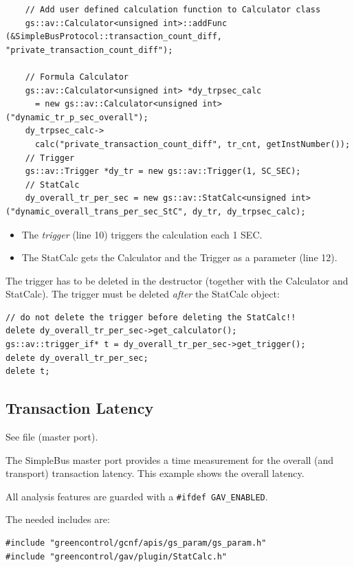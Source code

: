 \begin{lstlisting}
    // Add user defined calculation function to Calculator class
    gs::av::Calculator<unsigned int>::addFunc        (&SimpleBusProtocol::transaction_count_diff, "private_transaction_count_diff"); 

    // Formula Calculator
    gs::av::Calculator<unsigned int> *dy_trpsec_calc
      = new gs::av::Calculator<unsigned int> ("dynamic_tr_p_sec_overall");
    dy_trpsec_calc->
      calc("private_transaction_count_diff", tr_cnt, getInstNumber());
    // Trigger
    gs::av::Trigger *dy_tr = new gs::av::Trigger(1, SC_SEC);
    // StatCalc
    dy_overall_tr_per_sec = new gs::av::StatCalc<unsigned int> ("dynamic_overall_trans_per_sec_StC", dy_tr, dy_trpsec_calc);
\end{lstlisting}

\begin{itemize}
	\item  The {\em trigger} (line 10) triggers the calculation each 1 SEC.
	\item  The StatCalc gets the Calculator and the Trigger as a parameter (line 12).
\end{itemize}

The trigger has to be deleted in the destructor (together with the Calculator and StatCalc). The trigger must be deleted {\em after} the StatCalc object:
\begin{lstlisting}
// do not delete the trigger before deleting the StatCalc!!
delete dy_overall_tr_per_sec->get_calculator();
gs::av::trigger_if* t = dy_overall_tr_per_sec->get_trigger();
delete dy_overall_tr_per_sec;
delete t;
\end{lstlisting}


\subsection{Transaction Latency}

See file  (master port).

The SimpleBus master port provides a time measurement for the overall (and transport) transaction latency. This example shows the overall latency.

All analysis features are guarded with a \lstinline[language=TeX]|#ifdef GAV_ENABLED|.

The needed includes are:
\begin{lstlisting}
#include "greencontrol/gcnf/apis/gs_param/gs_param.h"
#include "greencontrol/gav/plugin/StatCalc.h"
\end{lstlisting}

